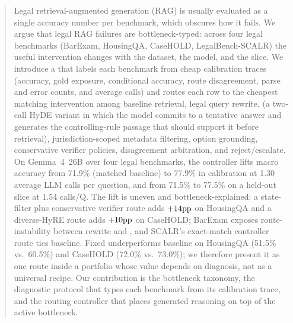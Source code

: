 \begin{abstract}
Legal retrieval-augmented generation (RAG) is usually evaluated as a single
accuracy number per benchmark, which obscures how it fails. We argue that
legal RAG failures are bottleneck-typed: across four legal benchmarks
(BarExam, HousingQA, CaseHOLD, LegalBench-SCALR) the useful intervention
changes with the dataset, the model, and the slice. We introduce a
\framework{} that labels each benchmark from cheap calibration traces (accuracy,
gold exposure, conditional accuracy, route disagreement, parse and error
counts, and average calls) and routes each row to the cheapest matching
intervention among baseline retrieval, legal query rewrite, \hyre{} (a
two-call HyDE variant in which the model commits to a tentative answer and
generates the controlling-rule passage that should support it before
retrieval), jurisdiction-scoped metadata filtering, option grounding,
conservative verifier policies, disagreement arbitration, and reject/escalate.
On Gemma~4~26B over four legal benchmarks, the controller lifts macro accuracy
from 71.9\% (matched baseline) to 77.9\% in calibration at 1.30 average LLM
calls per question, and from 71.5\% to 77.5\% on a held-out slice at 1.54
calls/Q. The lift is uneven and bottleneck-explained: a state-filter plus
conservative verifier route adds $+14\pp$ on HousingQA and a diverse-HyRE
route adds $+10\pp$ on CaseHOLD; BarExam exposes route-instability between
rewrite and \hyre{}, and SCALR's exact-match controller route ties baseline.
Fixed \hyre{} underperforms baseline on HousingQA (51.5\% vs.\ 60.5\%) and
CaseHOLD (72.0\% vs.\ 73.0\%); we therefore present it as one route inside a
portfolio whose value depends on diagnosis, not as a universal recipe. Our
contribution is the bottleneck taxonomy, the diagnostic protocol that types
each benchmark from its calibration trace, and the routing controller that
places generated reasoning on top of the active bottleneck.
\end{abstract}
